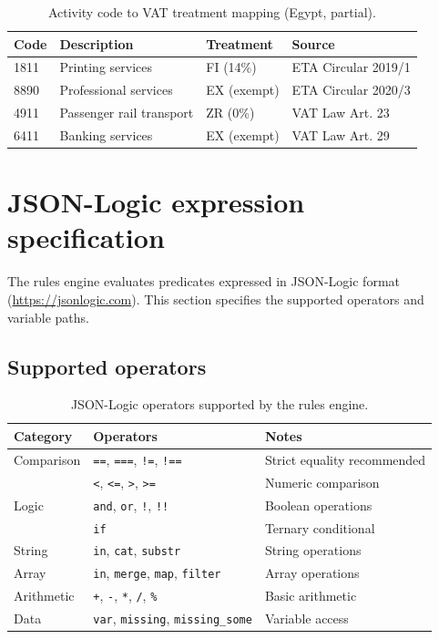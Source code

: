 \documentclass[11pt,a4paper,twoside]{report}
\begin{document}
\begin{table}[htbp]
\centering
\caption{Activity code to VAT treatment mapping (Egypt, partial).}
\label{tab:activity-lookup}
\footnotesize
\begin{tabularx}{\linewidth}{@{}l l l X@{}}
\toprule
\textbf{Code} & \textbf{Description} & \textbf{Treatment} & \textbf{Source} \\ \midrule
1811 & Printing services & FI (14\%) & ETA Circular 2019/1 \\
8890 & Professional services & EX (exempt) & ETA Circular 2020/3 \\
4911 & Passenger rail transport & ZR (0\%) & VAT Law Art. 23 \\
6411 & Banking services & EX (exempt) & VAT Law Art. 29 \\
\bottomrule
\end{tabularx}
\end{table}

\section{JSON-Logic expression specification}

The rules engine evaluates predicates expressed in JSON-Logic format
(\url{https://jsonlogic.com}). This section specifies the supported
operators and variable paths.

\subsection{Supported operators}

\begin{table}[htbp]
\centering
\caption{JSON-Logic operators supported by the rules engine.}
\label{tab:jsonlogic-ops}
\footnotesize
\begin{tabularx}{\linewidth}{@{}l l X@{}}
\toprule
\textbf{Category} & \textbf{Operators} & \textbf{Notes} \\ \midrule
Comparison & \texttt{==}, \texttt{===}, \texttt{!=}, \texttt{!==} & Strict equality recommended \\
& \texttt{<}, \texttt{<=}, \texttt{>}, \texttt{>=} & Numeric comparison \\
Logic      & \texttt{and}, \texttt{or}, \texttt{!}, \texttt{!!} & Boolean operations \\
& \texttt{if} & Ternary conditional \\
String     & \texttt{in}, \texttt{cat}, \texttt{substr} & String operations \\
Array      & \texttt{in}, \texttt{merge}, \texttt{map}, \texttt{filter} & Array operations \\
Arithmetic & \texttt{+}, \texttt{-}, \texttt{*}, \texttt{/}, \texttt{\%} & Basic arithmetic \\
Data       & \texttt{var}, \texttt{missing}, \texttt{missing\_some} & Variable access \\
\bottomrule
\end{tabularx}
\end{table}
\end{document}

